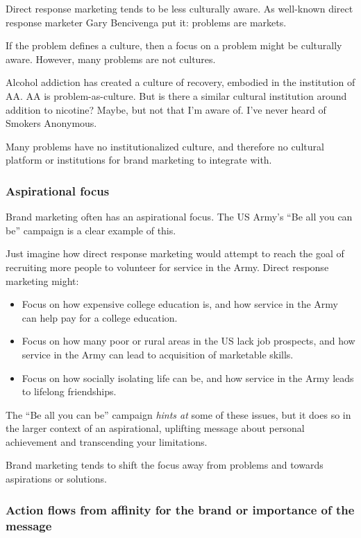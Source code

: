 \documentclass[13pt,]{tufte-handout}
\providecommand{\tightlist}{%
  \setlength{\itemsep}{0pt}\setlength{\parskip}{0pt}}
\begin{document}
Direct response marketing tends to be less culturally aware. As
well-known direct response marketer Gary Bencivenga put it: problems are
markets.

If the problem defines a culture, then a focus on a problem might be
culturally aware. However, many problems are not cultures.

Alcohol addiction has created a culture of recovery, embodied in the
institution of AA. AA is problem-as-culture. But is there a similar
cultural institution around addition to nicotine? Maybe, but not that
I'm aware of. I've never heard of Smokers Anonymous.

Many problems have no institutionalized culture, and therefore no
cultural platform or institutions for brand marketing to integrate with.

\hypertarget{aspirational-focus}{%
\subsubsection{Aspirational focus}\label{aspirational-focus}}

Brand marketing often has an aspirational focus. The US Army's ``Be all
you can be'' campaign is a clear example of this.

Just imagine how direct response marketing would attempt to reach the
goal of recruiting more people to volunteer for service in the Army.
Direct response marketing might:

\begin{itemize}
\tightlist
\item
  Focus on how expensive college education is, and how service in the
  Army can help pay for a college education.
\item
  Focus on how many poor or rural areas in the US lack job prospects,
  and how service in the Army can lead to acquisition of marketable
  skills.
\item
  Focus on how socially isolating life can be, and how service in the
  Army leads to lifelong friendships.
\end{itemize}

The ``Be all you can be'' campaign \emph{hints at} some of these issues,
but it does so in the larger context of an aspirational, uplifting
message about personal achievement and transcending your limitations.

Brand marketing tends to shift the focus away from problems and towards
aspirations or solutions.

\hypertarget{action-flows-from-affinity-for-the-brand-or-importance-of-the-message}{%
\subsubsection{Action flows from affinity for the brand or importance of
the
message}\label{action-flows-from-affinity-for-the-brand-or-importance-of-the-message}}
\end{document}
